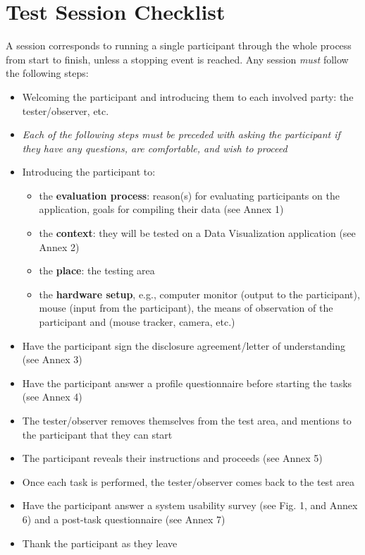 \documentclass[twocolumn, letterpaper,13pt]{scrartcl}
\begin{document}
    \section*{Test Session Checklist}
    A session corresponds to running a single participant through the whole process from start to finish, unless a stopping event is reached. Any session \textit{must} follow the following steps:
    \begin{itemize}
        \item Welcoming the participant and introducing them to each involved party: the tester/observer, etc.
        \item \textit{Each of the following steps must be preceded with asking the participant if they have any questions, are comfortable, and wish to proceed}
        \item Introducing the participant to:
        \begin{itemize}
            \item the \textbf{evaluation process}: reason(s) for evaluating participants on the application, goals for compiling their data (see Annex 1)
            \item the \textbf{context}: they will be tested on a Data Visualization application (see Annex 2)
            \item the \textbf{place}: the testing area
            \item the \textbf{hardware setup}, e.g., computer monitor (output to the participant), mouse (input from the participant), the means of observation of the participant and (mouse tracker, camera, etc.)
        \end{itemize}
        \item Have the participant sign the disclosure agreement/letter of understanding (see Annex 3)
        \item Have the participant answer a profile questionnaire before starting the tasks (see Annex 4)
        \item The tester/observer removes themselves from the test area, and mentions to the participant that they can start
        \item The participant reveals their instructions and proceeds (see Annex 5)
        \item Once each task is performed, the tester/observer comes back to the test area
        \item Have the participant answer a system usability survey (see Fig. 1, and Annex 6) and a post-task questionnaire (see Annex 7)
        \item Thank the participant as they leave
    \end{itemize}
    
\end{document}
